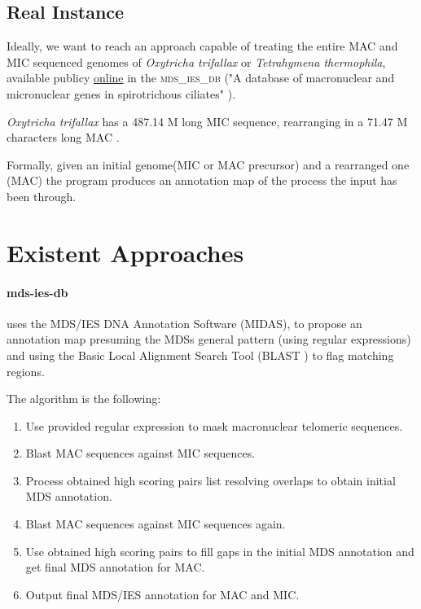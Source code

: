\subsection{Real Instance}

Ideally, we want to reach an approach capable of treating the entire MAC and MIC sequenced genomes of \textit{Oxytricha trifallax} or \textit{Tetrahymena thermophila}, available publicy \href{http://oxytricha.princeton.edu/mds_ies_db/}{online} in the \textsc{mds\_ies\_db} ("A database of macronuclear and micronuclear genes in spirotrichous ciliates" \cite{mdsiesdb}).

\textit{Oxytricha trifallax} has a 487.14 M long MIC sequence, rearranging in a 71.47 M characters long MAC \cite{mdsiesdb}.

Formally, given an initial genome(MIC or MAC precursor) and a rearranged one (MAC) the program produces an annotation map of the process the input has been through.

\clearpage

\section{Existent Approaches}

\paragraph{mds-ies-db}\cite{mdsiesdb} uses the MDS/IES DNA Annotation Software (MIDAS), \cite{midas} to propose an annotation map presuming the MDSs general pattern (using regular expressions) and using the Basic Local Alignment Search Tool (BLAST \cite{boratyn2013blast}) to flag matching regions.

The algorithm is the following:

\begin{enumerate}
  \item Use provided regular expression to mask macronuclear telomeric sequences.
  \item Blast MAC sequences against MIC sequences.
  \item Process obtained high scoring pairs list resolving overlaps to obtain initial MDS annotation.
  \item Blast MAC sequences against MIC sequences again.
  \item Use obtained high scoring pairs to fill gaps in the initial MDS annotation and get final MDS annotation for MAC.
  \item Output final MDS/IES annotation for MAC and MIC.
\end{enumerate}

